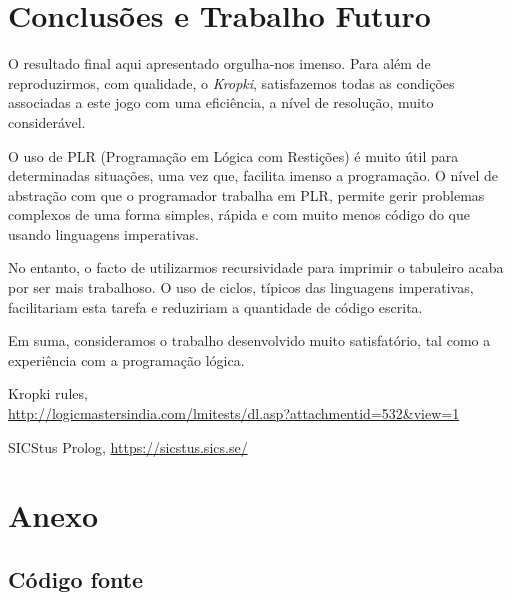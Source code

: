 \documentclass[runningheads,a4paper]{llncs}
\begin{document}
\section{Conclusões e Trabalho Futuro}

O resultado final aqui apresentado orgulha-nos imenso. Para além de reproduzirmos, com qualidade, o \textit{Kropki}, satisfazemos todas as condições associadas a este jogo com uma eficiência, a nível de resolução, muito considerável.

O uso de PLR (Programação em Lógica com Restições) é muito útil para determinadas situações, uma vez que, facilita imenso a programação. O nível de abstração com que o programador trabalha em PLR, permite gerir problemas complexos de uma forma simples, rápida e com muito menos código do que usando linguagens imperativas. 

No entanto, o facto de utilizarmos recursividade para imprimir o tabuleiro acaba por ser mais trabalhoso. O uso de ciclos, típicos das linguagens imperativas, facilitariam esta tarefa e reduziriam a quantidade de código escrita.

Em suma, consideramos o trabalho desenvolvido muito satisfatório, tal como a experiência com a programação lógica.  

\begin{thebibliography}{4}
	
	 Kropki rules,\\
	\url{http://logicmastersindia.com/lmitests/dl.asp?attachmentid=532&view=1}
	
	 SICStus Prolog, \url{https://sicstus.sics.se/}
	
\end{thebibliography}

\pagebreak

\section*{Anexo}

\subsection*{Código fonte}

\newenvironment{changemargin}[2]{%
	\begin{list}{}{%
			\setlength{\topsep}{0pt}%
			\setlength{\leftmargin}{#1}%
			\setlength{\rightmargin}{#2}%
			\setlength{\listparindent}{\parindent}%
			\setlength{\itemindent}{\parindent}%
			\setlength{\parsep}{\parskip}%
		}%
		\item[]}{
	\end{list}}
	
\end{document}
